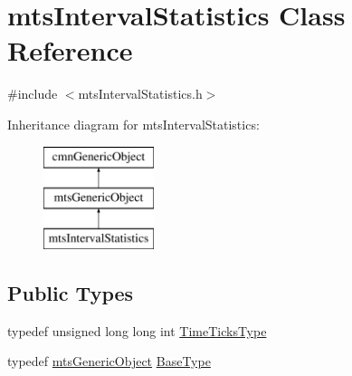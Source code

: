 \hypertarget{classmts_interval_statistics}{\section{mts\-Interval\-Statistics Class Reference}
\label{classmts_interval_statistics}
}


{\ttfamily \#include $<$mts\-Interval\-Statistics.\-h$>$}

Inheritance diagram for mts\-Interval\-Statistics\-:\begin{figure}[H]
\begin{center}
\leavevmode
\includegraphics[height=3.000000cm]{d1/d59/classmts_interval_statistics}
\end{center}
\end{figure}
\subsection*{Public Types}
\begin{DoxyCompactItemize}
\item 
typedef unsigned long long int \hyperlink{classmts_interval_statistics_a7cd13b925ee829840466b17fb3051075}{Time\-Ticks\-Type}
\item 
typedef \hyperlink{classmts_generic_object}{mts\-Generic\-Object} \hyperlink{classmts_interval_statistics_af698a08da830735b7cda531c4089ac04}{Base\-Type}
\end{DoxyCompactItemize}
